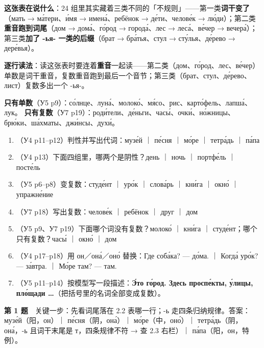 \textbf{这张表在说什么}：24 组里其实藏着三类不同的「不规则」——第一类\textbf{词干变了}（мать → ма́тери、и́мя → имена́、ребёнок → де́ти、челове́к → лю́ди）；第二类\textbf{重音跑到词尾}（дом → дома́、го́род → города́、лес → леса́、ве́чер → вечера́）；第三类\textbf{加了 -ья- 一类的后缀}（брат → бра́тья、стул → сту́лья、де́рево → дере́вья）。

\textbf{逐行读法}：读这张表时要连着\textbf{重音}一起读——第二类（дом、го́род、лес、ве́чер）单数是词干重音，复数重音跑到最后一个音节；第三类（брат、стул、де́рево、лист）复数多出一个 -ья-。

\textbf{只有单数}（У5 p9）：со́лнце、луна́、молоко́、мя́со、рис、карто́фель、лапша́、лук。
\textbf{只有复数}（У7 p19）：роди́тели、де́ньги、часы́、очки́、но́жницы、брю́ки、ша́хматы、джи́нсы、духи́。



\begin{enumerate}[label=\textbf{第 \arabic* 题}]
\item （У4 p11--p12）判性并写出代词：музе́й ｜ пе́сня ｜ мо́ре ｜ тетра́дь ｜ па́па
\item （У4 p13）下面四组里，哪两个是阴性？день ｜ ночь ｜ портфе́ль ｜ посте́ль
\item （У5 p6--p8）变复数：студе́нт ｜ уро́к ｜ слова́рь ｜ кни́га ｜ окно́ ｜ упражне́ние
\item （У7 p18）写出复数：челове́к ｜ ребёнок ｜ друг ｜ дом
\item （У5 p9、У7 p19）下面哪个词没有复数？молоко́ ｜ кни́га ｜ студе́нт；哪个只有复数？часы́ ｜ окно́ ｜ дом
\item （У4 p17--p18）用 он／она́／оно́ 替换：Где соба́ка? — \blank до́ма. ｜ Когда́ уро́к? — \blank за́втра. ｜ Мо́ре там? — \blank там.
\item （У5 p11--p14）按模型写一段描述：\textbf{Э́то го́род. Здесь проспе́кты, у́лицы, пло́щади …}（把括号里的名词全部变成复数）。
\end{enumerate}

\textbf{第 1 题}　关键一步：先看词尾落在 2.2 表哪一行；-ь 走四条归纳规律。答案：музе́й（阳，он）｜ пе́сня（阴，она́）｜ мо́ре（中，оно́）｜ тетра́дь（阴，она́，-ь 且词干末尾是 т，四条规律不符 → 查 2.3 右栏）｜ па́па（阳，он，特例）。

